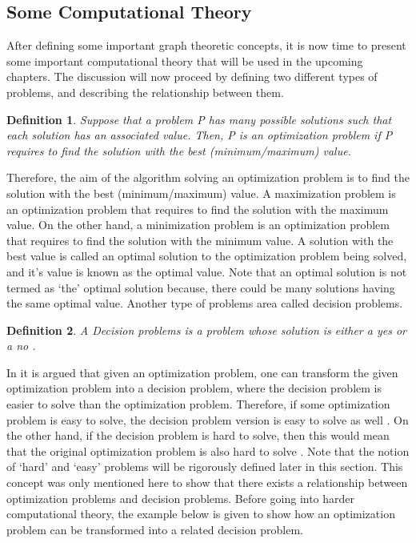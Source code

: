 \documentclass[12pt]{article}
\newtheorem{definition}{Definition}[subsection]
\numberwithin{equation}{subsection}
\numberwithin{table}{subsection}
\numberwithin{algorithm}{subsection}
\numberwithin{figure}{subsection}
\begin{document}
\subsection{Some Computational Theory}
\label{computational_theory}
After defining some important graph theoretic concepts, it is now time to present some important computational theory that will be used in the upcoming chapters. The discussion will now proceed by defining two different types of problems, and describing the relationship between them.
\begin{definition}
\label{optimization problems}
Suppose that a problem P has many possible solutions such that each solution has an associated value. Then, P is an optimization problem if P requires to find the solution with the best (minimum/maximum) value.  
\end{definition}
Therefore, the aim of the algorithm solving an optimization problem is to find the solution with the best (minimum/maximum) value. A maximization problem is an optimization problem that requires to find the solution with the maximum value. On the other hand, a minimization problem is an optimization problem that requires to find the solution with the minimum value. A solution with the best value is called an optimal solution to the optimization problem being solved, and it's value is known as the optimal value. Note that an optimal solution is not termed as `the' optimal solution because, there could be many solutions having the same optimal value. Another type of problems area called decision problems. \cite{cormen_leiserson_rivest_stein}
\begin{definition}
\label{decision problems}
A Decision problems is a problem whose solution is either a yes or a no .
\end{definition}
In \cite{cormen_leiserson_rivest_stein} it is argued that given an optimization problem, one can transform the given optimization problem into a decision problem, where the decision problem is easier to solve than the optimization problem. Therefore, if some optimization problem is easy to solve, the decision problem version is easy to solve as well \cite{cormen_leiserson_rivest_stein}. On the other hand, if the decision problem is hard to solve, then this would mean that the original optimization problem is also hard to solve \cite{cormen_leiserson_rivest_stein}. Note that the notion of `hard' and `easy' problems will be rigorously defined later in this section. This concept was only mentioned here to show that there exists a relationship between optimization problems and decision problems. Before going into harder computational theory, the example below is given to show how an optimization problem can be transformed into a related decision problem.
\end{document}
